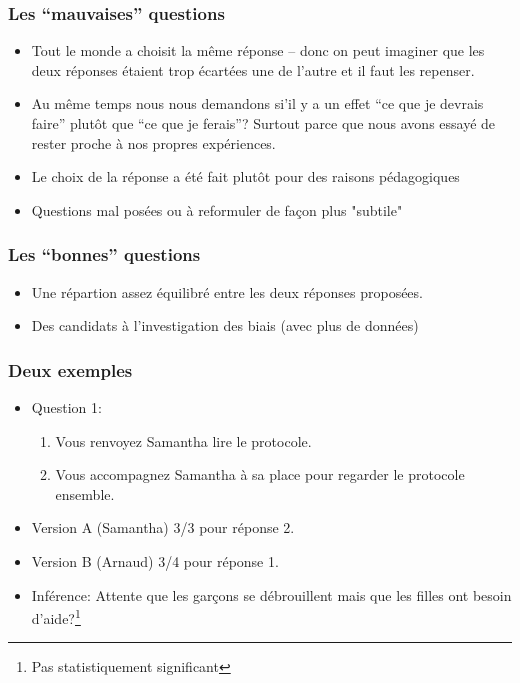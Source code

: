 \documentclass{beamer}
\begin{document}
\begin{frame}
  \frametitle{Les ``mauvaises'' questions}
  \begin{itemize}
  \item Tout le monde a choisit la même réponse -- donc on peut imaginer que les deux réponses étaient
  trop écartées une de l'autre et il faut les repenser.
  \item Au même temps nous nous demandons si'il y a un effet ``ce que je devrais faire'' plutôt que ``ce que 
  je ferais''? Surtout parce que nous avons essayé de rester proche à nos propres expériences.
 \item Le choix de la réponse a été fait plutôt  pour des raisons pédagogiques  
 \item Questions mal posées ou à reformuler de façon plus "subtile"
\end{itemize}
\end{frame}

\begin{frame}
  \frametitle{Les ``bonnes'' questions}
  \begin{itemize}
  \item Une répartion assez équilibré entre les deux réponses proposées.
  \item  Des candidats à l'investigation des biais (avec plus de données)
  \end{itemize}
\end{frame}

\begin{frame}
  \frametitle{Deux exemples}
  \begin{itemize}
  \item Question 1:
    \begin{enumerate}
    \item Vous renvoyez Samantha lire le protocole. 
    \item Vous accompagnez Samantha à sa place pour regarder le protocole ensemble. 
    \end{enumerate}
  \item Version A (Samantha) 3/3 pour réponse 2.
  \item Version B (Arnaud) 3/4 pour réponse 1.
  \item Inférence: Attente que les garçons se débrouillent mais que les filles ont
    besoin d'aide?\footnote{Pas statistiquement significant} 
  \end{itemize}
\end{frame}
\end{document}
